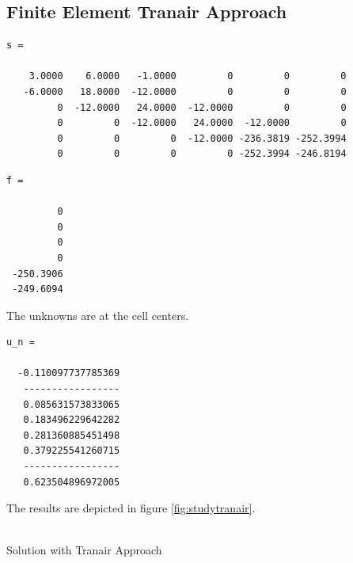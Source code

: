 \documentclass[a4paper,12pt]{article}
\makeatletter
\newenvironment{figurehere}
  {\def\@captype{figure}}
  {}
\makeatother
\begin{document}
\subsection{Finite Element Tranair Approach}
\begin{verbatim}
s =

    3.0000    6.0000   -1.0000         0         0         0
   -6.0000   18.0000  -12.0000         0         0         0
         0  -12.0000   24.0000  -12.0000         0         0
         0         0  -12.0000   24.0000  -12.0000         0
         0         0         0  -12.0000 -236.3819 -252.3994
         0         0         0         0 -252.3994 -246.8194

\end{verbatim}
\begin{verbatim}
f =

         0
         0
         0
         0
 -250.3906
 -249.6094
\end{verbatim}
The unknowns are at the cell centers.
\begin{verbatim}
u_n =

  -0.110097737785369
   -----------------
   0.085631573833065
   0.183496229642282
   0.281360885451498
   0.379225541260715
   -----------------
   0.623504896972005
\end{verbatim}
The results are depicted in figure \ref{fig:studytranair}.\\
\begin{center}
\begin{figurehere} 
\\
\caption{Solution with Tranair Approach}\label{fig:studytranair}
\end{figurehere}
\end{center}
\end{document}
